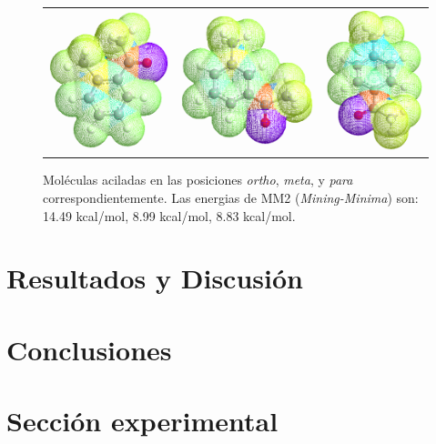 \documentclass[fleqn,11pt]{SelfArx}
\begin{document}
\begin{figure}[h]
	\centering
	\begin{tabular}{ccc}
		\includegraphics[width=0.3\linewidth]{structures/ortho.png} & 
		\includegraphics[width=0.3\linewidth]{structures/meta.png} &
		\includegraphics[width=0.25\linewidth]{structures/para.png}
	\end{tabular}
	
	\caption{Moléculas aciladas en las posiciones \textit{ortho}, \textit{meta}, y \textit{para} correspondientemente. Las energias de MM2 (\textit{Mining-Minima}) son: 14.49 kcal/mol, 8.99 kcal/mol, 8.83 kcal/mol.}
\end{figure}

\newpage
\section{Resultados y Discusi\'on}
\section{Conclusiones}

\section{Secci\'on experimental}
\end{document}
